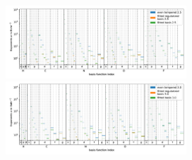 \begin{figure}
   \centering
   \includegraphics[width=0.6\textwidth]{chapters/results/results_images/basis_functions_with_size2.5}
   \includegraphics[width=0.6\textwidth]{chapters/results/results_images/basis_functions_with_size3.0}
\end{figure}
 







